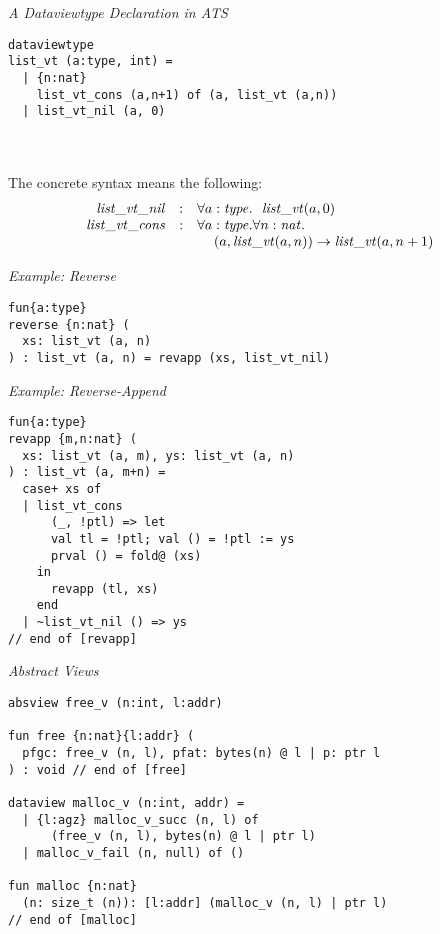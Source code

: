 \documentclass[pdf]{prosper}
\begin{document}
\def\vtList{{\it list\_vt}}
\def\cListvtNil{{\it list\_vt\_nil}}
\def\cListvtCons{{\it list\_vt\_cons}}
\begin{slide}{\em A Dataviewtype Declaration in ATS}
{\blue\begin{verbatim}
dataviewtype
list_vt (a:type, int) =
  | {n:nat}
    list_vt_cons (a,n+1) of (a, list_vt (a,n))
  | list_vt_nil (a, 0)
\end{verbatim}
}~\\~\\
The concrete syntax means the following:
\[\begin{array}{rcl}
\cListvtNil  &:& \forall a:\stype.~~\vtList(a,0) \\
\cListvtCons &:& \forall a:\stype.\forall n:\snat.~~\\
             & &\kern12pt(a, \vtList(a,n))\timp\vtList(a,n+1) \\
\end{array}\]
\end{slide}
\begin{slide}{\em Example: Reverse}
{\blue\begin{verbatim}
fun{a:type}
reverse {n:nat} (
  xs: list_vt (a, n)
) : list_vt (a, n) = revapp (xs, list_vt_nil)
\end{verbatim}
}
\end{slide}
\begin{slide}{\em Example: Reverse-Append}
{\blue\begin{verbatim}
fun{a:type}
revapp {m,n:nat} (
  xs: list_vt (a, m), ys: list_vt (a, n)
) : list_vt (a, m+n) =
  case+ xs of
  | list_vt_cons
      (_, !ptl) => let
      val tl = !ptl; val () = !ptl := ys
      prval () = fold@ (xs)
    in
      revapp (tl, xs)
    end
  | ~list_vt_nil () => ys
// end of [revapp]
\end{verbatim}
}
\end{slide}
\begin{slide}{\em Abstract Views}
{\blue\begin{verbatim}
absview free_v (n:int, l:addr)

fun free {n:nat}{l:addr} (
  pfgc: free_v (n, l), pfat: bytes(n) @ l | p: ptr l
) : void // end of [free]

dataview malloc_v (n:int, addr) =
  | {l:agz} malloc_v_succ (n, l) of
      (free_v (n, l), bytes(n) @ l | ptr l)
  | malloc_v_fail (n, null) of ()

fun malloc {n:nat}
  (n: size_t (n)): [l:addr] (malloc_v (n, l) | ptr l)
// end of [malloc]

\end{verbatim}
}
\end{slide}
\end{document}
